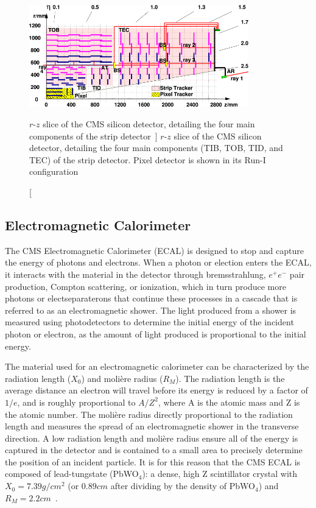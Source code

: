 \begin{figure}[htbp]
	\centering
	\includegraphics[width=0.85\textwidth]{figs/03_experiment/las.png}
	\caption
	[$r$-$z$ slice of the CMS silicon detector, detailing the four main components of the strip detector~\cite{Chatrchyan:1211825}]
	{$r$-$z$ slice of the CMS silicon detector, detailing the four main components (TIB, TOB, TID, and TEC) of the strip detector. Pixel detector is shown in its Run-I configuration~\cite{Chatrchyan:1211825}}
	\label{fig:strip}
\end{figure}

\subsection{Electromagnetic Calorimeter} \label{sec:CMS_ECAL}
The CMS Electromagnetic Calorimeter (ECAL) is designed to stop and capture the energy of photons and electrons. When a photon or election enters the ECAL, it interacts with the material in the detector through bremsstrahlung, $e^+e^-$ pair production, Compton scattering, or ionization, which in turn produce more photons or electseparaterons that continue these processes in a cascade that is referred to as an electromagnetic shower. The light produced from a shower is measured using photodetectors to determine the initial energy of the incident photon or electron, as the amount of light produced is proportional to the initial energy.

The material used for an electromagnetic calorimeter can be characterized by the radiation length ($X_0$) and moli\`ere radius ($R_M$). The radiation length is the average distance an electron will travel before its energy is reduced by a factor of $1/e$, and is roughly proportional to $A/Z^2$, where A is the atomic mass and Z is the atomic number. The moli\`ere radius directly proportional to the radiation length and measures the spread of an electromagnetic shower in the transverse direction. A low radiation length and moli\`ere radius ensure all of the energy is captured in the detector and is contained to a small area to precisely determine the position of an incident particle. It is for this reason that the CMS ECAL is composed of lead-tungstate (PbWO$_4$): a dense, high Z scintillator crystal with $X_0=7.39\unit{g/cm^2}$ (or $0.89\unit{cm}$ after dividing by the density of PbWO$_4$) and $R_M=2.2\unit{cm}$~\cite{Workman:2022ynf}.

